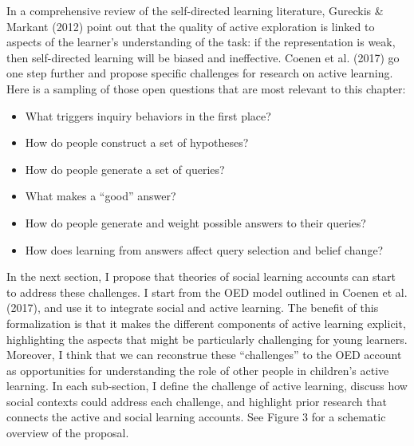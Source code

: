 \documentclass[oneside]{report}
\begin{document}
In a comprehensive review of the self-directed learning literature,
Gureckis \& Markant (2012) point out that the quality of active
exploration is linked to aspects of the learner's understanding of the
task: if the representation is weak, then self-directed learning will be
biased and ineffective. Coenen et al. (2017) go one step further and
propose specific challenges for research on active learning. Here is a
sampling of those open questions that are most relevant to this chapter:
\begin{itemize}
\tightlist
\item
  What triggers inquiry behaviors in the first place?
\item
  How do people construct a set of hypotheses?
\item
  How do people generate a set of queries?
\item
  What makes a ``good'' answer?
\item
  How do people generate and weight possible answers to their queries?
\item
  How does learning from answers affect query selection and belief
  change?
\end{itemize}
\noindent In the next section, I propose that theories of social
learning accounts can start to address these challenges. I start from
the OED model outlined in Coenen et al. (2017), and use it to integrate
social and active learning. The benefit of this formalization is that it
makes the different components of active learning explicit, highlighting
the aspects that might be particularly challenging for young learners.
Moreover, I think that we can reconstrue these ``challenges'' to the OED
account as opportunities for understanding the role of other people in
children's active learning. In each sub-section, I define the challenge
of active learning, discuss how social contexts could address each
challenge, and highlight prior research that connects the active and
social learning accounts. See Figure 3 for a schematic overview of the
proposal.

\end{document}
